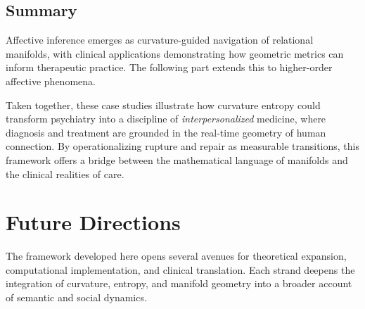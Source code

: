\documentclass{article}
\theoremstyle{definition}
\begin{document}
\subsection{Summary}

Affective inference emerges as curvature-guided navigation of relational manifolds, with clinical applications demonstrating how geometric metrics can inform therapeutic practice. The following part extends this to higher-order affective phenomena.


Taken together, these case studies illustrate how curvature entropy could
transform psychiatry into a discipline of \emph{interpersonalized} medicine,
where diagnosis and treatment are grounded in the real-time geometry of human
connection. By operationalizing rupture and repair as measurable transitions,
this framework offers a bridge between the mathematical language of manifolds
and the clinical realities of care.


\section{Future Directions}

The framework developed here opens several avenues for theoretical expansion,
computational implementation, and clinical translation. Each strand deepens the
integration of curvature, entropy, and manifold geometry into a broader account
of semantic and social dynamics.
\end{document}
